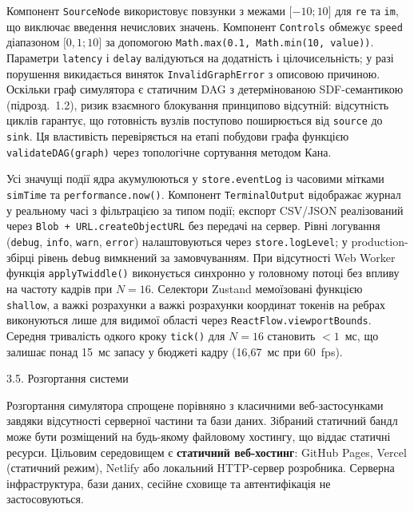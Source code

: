 \documentclass[
]{article}
\begin{document}
Компонент \texttt{SourceNode} використовує повзунки з межами
\(\lbrack - 10;10\rbrack\) для \texttt{re} та \texttt{im}, що виключає
введення нечислових значень. Компонент \texttt{Controls} обмежує
\texttt{speed} діапазоном \(\lbrack 0,1;10\rbrack\) за допомогою
\texttt{Math.max}\texttt{(0.1,\ }\texttt{Math.min}\texttt{(10,\ }\texttt{value}\texttt{))}.
Параметри \texttt{latency} і \texttt{delay} валідуються на додатність і
цілочисельність; у разі порушення викидається виняток
\texttt{InvalidGraphError} з описовою причиною. Оскільки граф симулятора
є статичним DAG з детермінованою SDF-семантикою (підрозд.~1.2), ризик
взаємного блокування принципово відсутній: відсутність циклів гарантує,
що готовність вузлів поступово поширюється від \texttt{source} до
\texttt{sink}. Ця властивість перевіряється на етапі побудови графа
функцією \texttt{validateDAG}\texttt{(}\texttt{graph}\texttt{)} через
топологічне сортування методом Кана.

Усі значущі події ядра акумулюються у \texttt{store.eventLog} із
часовими мітками \texttt{simTime} та
\texttt{performance.now}\texttt{()}. Компонент \texttt{TerminalOutput}
відображає журнал у реальному часі з фільтрацією за типом події; експорт
CSV/JSON реалізований через
\texttt{Blob}\texttt{\ +\ }\texttt{URL.createObjectURL} без передачі на
сервер. Рівні логування (\texttt{debug}, \texttt{info}, \texttt{warn},
\texttt{error}) налаштовуються через \texttt{store.logLevel}; у
production-збірці рівень \texttt{debug} вимкнений за замовчуванням. При
відсутності Web Worker функція \texttt{applyTwiddle}\texttt{()}
виконується синхронно у головному потоці без впливу на частоту кадрів
при \(N = 16\). Селектори Zustand мемоїзовані функцією \texttt{shallow},
а важкі розрахунки а важкі розрахунки координат токенів на ребрах
виконуються лише для видимої області через
\texttt{ReactFlow.viewportBounds}. Середня тривалість одкого кроку
\texttt{tick}\texttt{()} для \(N = 16\) становить \(< 1\)~мс, що залишає
понад 15~мс запасу у бюджеті кадру (16,67~мс при 60~fps).

\protect{}\label{_Toc229681152}{}3.5. Розгортання системи

Розгортання симулятора спрощене порівняно з класичними веб-застосунками
завдяки відсутності серверної частини та бази даних. Зібраний статичний
бандл може бути розміщений на будь-якому файловому хостингу, що віддає
статичні ресурси. Цільовим середовищем є \textbf{статичний веб-хостинг}:
GitHub Pages, Vercel (статичний режим), Netlify або локальний
HTTP-сервер розробника. Серверна інфраструктура, бази даних, сесійне
сховище та автентифікація не застосовуються.
\end{document}
